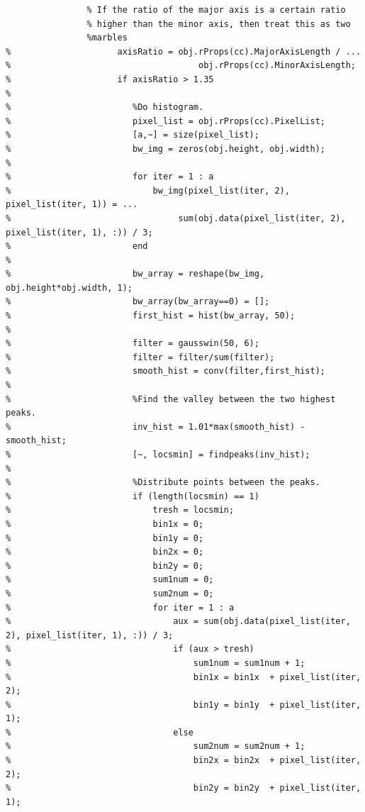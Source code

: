 \documentclass[10pt,a4paper,onecolumn]{report}
\begin{document}
\begin{lstlisting}
                % If the ratio of the major axis is a certain ratio
                % higher than the minor axis, then treat this as two
                %marbles
%                     axisRatio = obj.rProps(cc).MajorAxisLength / ...
%                                     obj.rProps(cc).MinorAxisLength;
%                     if axisRatio > 1.35
%                         
%                        %Do histogram.
%                        pixel_list = obj.rProps(cc).PixelList;
%                        [a,~] = size(pixel_list);
%                        bw_img = zeros(obj.height, obj.width);
%                        
%                        for iter = 1 : a
%                            bw_img(pixel_list(iter, 2), pixel_list(iter, 1)) = ...
%                                 sum(obj.data(pixel_list(iter, 2), pixel_list(iter, 1), :)) / 3;
%                        end
%                        
%                        bw_array = reshape(bw_img, obj.height*obj.width, 1);
%                        bw_array(bw_array==0) = [];
%                        first_hist = hist(bw_array, 50);
%                        
%                        filter = gausswin(50, 6);
%                        filter = filter/sum(filter);
%                        smooth_hist = conv(filter,first_hist);
%                        
%                        %Find the valley between the two highest peaks.
%                        inv_hist = 1.01*max(smooth_hist) - smooth_hist;
%                        [~, locsmin] = findpeaks(inv_hist);
%                        
%                        %Distribute points between the peaks.
%                        if (length(locsmin) == 1)
%                            tresh = locsmin;
%                            bin1x = 0;
%                            bin1y = 0;
%                            bin2x = 0;
%                            bin2y = 0;
%                            sum1num = 0;
%                            sum2num = 0;
%                            for iter = 1 : a
%                                aux = sum(obj.data(pixel_list(iter, 2), pixel_list(iter, 1), :)) / 3;
%                                if (aux > tresh)
%                                    sum1num = sum1num + 1;
%                                    bin1x = bin1x  + pixel_list(iter, 2);
%                                    bin1y = bin1y  + pixel_list(iter, 1);
%                                else
%                                    sum2num = sum2num + 1;
%                                    bin2x = bin2x  + pixel_list(iter, 2);
%                                    bin2y = bin2y  + pixel_list(iter, 1);

\end{lstlisting}
\end{document}
